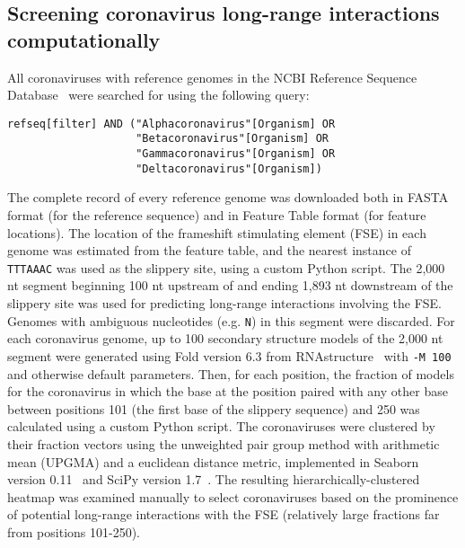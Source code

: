 \documentclass[main.tex]{subfiles}
\begin{document}
\subsection{Screening coronavirus long-range interactions computationally}
\label{screen_lri_comp}

All coronaviruses with reference genomes in the NCBI Reference Sequence Database~\cite{OLeary2016} were searched for using the following query:
\begin{verbatim}
refseq[filter] AND ("Alphacoronavirus"[Organism] OR
                    "Betacoronavirus"[Organism] OR
                    "Gammacoronavirus"[Organism] OR
                    "Deltacoronavirus"[Organism])
\end{verbatim}
The complete record of every reference genome was downloaded both in FASTA format (for the reference sequence) and in Feature Table format (for feature locations).
The location of the frameshift stimulating element (FSE) in each genome was estimated from the feature table, and the nearest instance of \verb|TTTAAAC| was used as the slippery site, using a custom Python script.
The 2,000 nt segment beginning 100 nt upstream of and ending 1,893 nt downstream of the slippery site was used for predicting long-range interactions involving the FSE.
Genomes with ambiguous nucleotides (e.g. \verb|N|) in this segment were discarded.
For each coronavirus genome, up to 100 secondary structure models of the 2,000 nt segment were generated using Fold version 6.3 from RNAstructure~\cite{Mathews2004a} with \verb|-M 100| and otherwise default parameters.
Then, for each position, the fraction of models for the coronavirus in which the base at the position paired with any other base between positions 101 (the first base of the slippery sequence) and 250 was calculated using a custom Python script.
The coronaviruses were clustered by their fraction vectors using the unweighted pair group method with arithmetic mean (UPGMA) and a euclidean distance metric, implemented in Seaborn version 0.11~\cite{Waskom2021} and SciPy version 1.7~\cite{Virtanen2020}.
The resulting hierarchically-clustered heatmap was examined manually to select coronaviruses based on the prominence of potential long-range interactions with the FSE (relatively large fractions far from positions 101-250).
\end{document}
